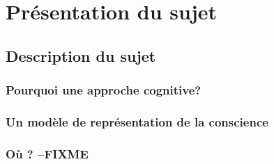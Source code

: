 \part{Présentation du sujet}

\clearemptydoublepage
\chapter{Description du sujet} 


\section{Pourquoi une approche cognitive?} 


\section{Un modèle de représentation de la conscience}


\section{Où ? --FIXME}
